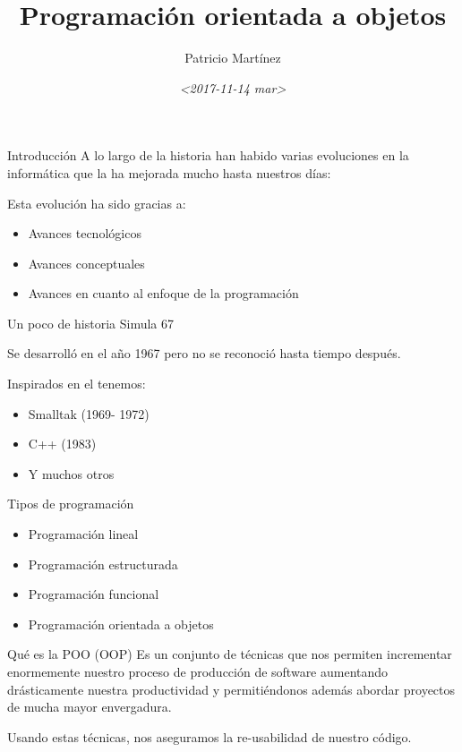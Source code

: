 \documentclass[t]{beamer}
\author{Patricio Martínez}
\date{\textit{<2017-11-14 mar>}}
\title{Programación orientada a objetos}
\begin{document}
\maketitle
\begin{frame}[label={sec:orgaa21e36}]{Introducción}
A lo largo de la historia han habido varias evoluciones en la informática que la ha mejorada mucho hasta nuestros días:

Esta evolución ha sido gracias a:

\begin{itemize}
\item Avances tecnológicos
\item Avances conceptuales
\item Avances en cuanto al enfoque de la programación
\end{itemize}
\end{frame}

\begin{frame}[label={sec:org9f73577}]{Un poco de historia}
\alert{Simula 67}

Se desarrolló en el año \alert{1967} pero no se reconoció hasta tiempo después. 

Inspirados en el tenemos:

\begin{itemize}
\item Smalltak (1969- 1972)
\item C++ (1983)
\item Y muchos otros
\end{itemize}

\begin{block}{Tipos de programación}
\begin{itemize}
\item Programación lineal
\item Programación estructurada
\item Programación funcional
\item Programación orientada a objetos
\end{itemize}
\end{block}
\end{frame}

\begin{frame}[label={sec:org5dddb92}]{Qué es la POO (OOP)}
Es un conjunto de técnicas que nos permiten incrementar enormemente nuestro proceso de producción de software aumentando drásticamente nuestra productividad y permitiéndonos además abordar proyectos de mucha mayor envergadura.

Usando estas técnicas, nos aseguramos la re-usabilidad de nuestro código.
\end{frame}
\end{document}
